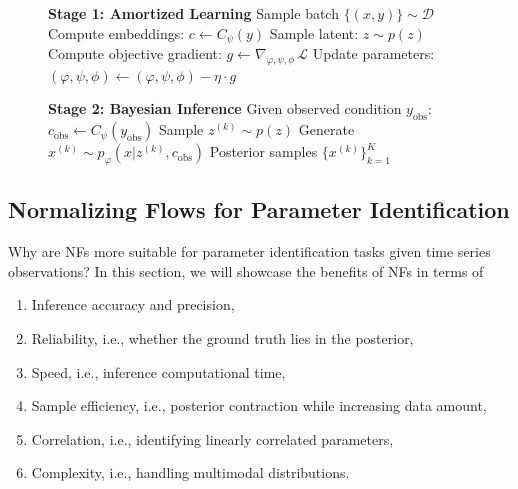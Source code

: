 \begin{figure}[htbp]
\begin{minipage}[t]{0.48\textwidth}
\begin{algorithm}[H]
\begin{algorithmic}[1]
            \vspace{0.1cm}
            \STATE \textbf{Stage 1: Amortized Learning}
                \STATE Sample batch $\{(x, y)\} \sim \mathcal{D}$
                \STATE Compute embeddings: $c \leftarrow C_\psi(y)$
                \STATE Sample latent: $z \sim p(z)$
                \STATE Compute objective gradient:
                \STATE $g \leftarrow \nabla_{\varphi,\psi,\phi} \, \mathcal{L}$
                \STATE Update parameters: $(\varphi, \psi, \phi) \leftarrow (\varphi, \psi, \phi) - \eta \cdot g$
            \ENDWHILE

            \STATE \textbf{Stage 2: Bayesian Inference}
            \STATE Given observed condition $y_{\text{obs}}$:
            \STATE $c_{\text{obs}} \leftarrow C_\psi(y_{\text{obs}})$
                \STATE Sample $z^{(k)} \sim p(z)$
                \STATE Generate $x^{(k)} \sim p_\varphi(x |z^{(k)}, c_{\text{obs}})$
            \ENDFOR
            \RETURN Posterior samples $\{x^{(k)}\}_{k=1}^K$
            \end{algorithmic}
        \end{algorithm}
    \end{minipage}
\end{figure}

\subsection{Normalizing Flows for Parameter Identification}
Why are \acp{NF} more suitable for parameter identification tasks given time series observations? In this section, we will showcase the benefits of \acp{NF} in terms of 
\begin{enumerate}
    \renewcommand{\labelenumi}{\textcircled{\scriptsize\arabic{enumi}}}
    \item Inference accuracy and precision,
    \item Reliability, i.e., whether the ground truth lies in the posterior,
    \item Speed, i.e., inference computational time,
    \item Sample efficiency, i.e., posterior contraction while increasing data amount,
    \item Correlation, i.e., identifying linearly correlated parameters,
    \item Complexity, i.e., handling multimodal distributions.
\end{enumerate}

